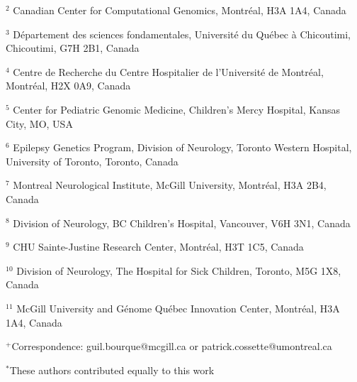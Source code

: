 $^{2}$ Canadian Center for Computational Genomics, Montr\'eal, H3A 1A4, Canada

$^{3}$ D\'epartement des sciences fondamentales, Universit\'e du Qu\'ebec \`a  Chicoutimi, Chicoutimi, G7H 2B1, Canada

$^{4}$ Centre de Recherche du Centre Hospitalier de l'Universit\'e de Montr\'eal, Montr\'eal, H2X 0A9, Canada

$^{5}$ Center for Pediatric Genomic Medicine, Children's Mercy Hospital, Kansas City, MO, USA

$^{6}$ Epilepsy Genetics Program, Division of Neurology, Toronto Western Hospital, University of Toronto, Toronto, Canada

$^{7}$ Montreal Neurological Institute, McGill University, Montr\'eal, H3A 2B4, Canada

$^{8}$ Division of Neurology, BC Children's Hospital, Vancouver, V6H 3N1, Canada

$^{9}$ CHU Sainte-Justine Research Center, Montr\'eal, H3T 1C5, Canada

$^{10}$ Division of Neurology, The Hospital for Sick Children, Toronto, M5G 1X8, Canada

$^{11}$ McGill University and G\'enome Qu\'ebec Innovation Center, Montr\'eal, H3A 1A4, Canada

$^+$Correspondence: guil.bourque@mcgill.ca or patrick.cossette@umontreal.ca

$^*$These authors contributed equally to this work


\normalsize
\doublespacing

